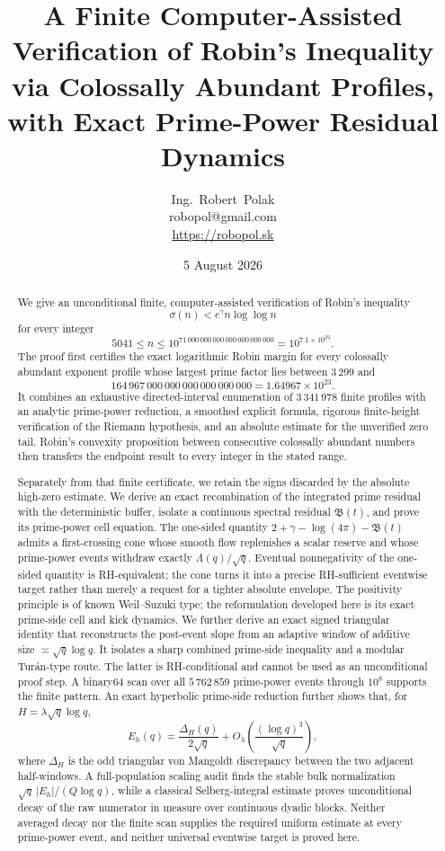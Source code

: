 \documentclass[11pt,a4paper]{article}
\title{\bfseries A Finite Computer-Assisted Verification of Robin's Inequality\\
\large via Colossally Abundant Profiles, with Exact Prime-Power Residual Dynamics}
\author{Ing.~Robert~Polak \\ \small robopol@gmail.com \\ \small \url{https://robopol.sk}}
\date{5 August 2026}
\numberwithin{equation}{section}
\theoremstyle{definition}
\newcommand{\Xmin}{3\,299}
\newcommand{\Xmax}{164\,967\,000\,000\,000\,000\,000\,000}
\newcommand{\Kcut}{71\,000\,000\,000\,000\,000\,000\,000}
\newcommand{\Bres}{\mathfrak B}
\begin{document}
\maketitle

\begin{abstract}
We give an unconditional finite, computer-assisted verification of Robin's
inequality
\[
  \sigma(n)<e^\gamma n\log\log n
\]
for every integer
\[
  5041\le n\le 10^{\Kcut}
  =10^{7.1\times10^{22}}.
\]
The proof first certifies the exact logarithmic Robin margin for every
colossally abundant exponent profile whose largest prime factor lies between
\(\Xmin\) and
\[
  \Xmax=1.64967\times10^{23}.
\]
It combines an exhaustive directed-interval enumeration of
\(3\,341\,978\) finite profiles with an analytic prime-power reduction, a
smoothed explicit formula, rigorous finite-height verification of the
Riemann hypothesis, and an absolute estimate for the unverified zero tail.
Robin's convexity proposition between consecutive colossally abundant
numbers then transfers the endpoint result to every integer in the stated
range.

Separately from that finite certificate, we retain the signs discarded by
the absolute high-zero estimate.  We derive an exact recombination of the
integrated prime residual with the deterministic buffer, isolate a continuous
spectral residual \(\Bres(t)\), and prove its prime-power cell equation.  The
one-sided quantity \(2+\gamma-\log(4\pi)-\Bres(t)\) admits a first-crossing
cone whose smooth flow replenishes a scalar reserve and whose prime-power
events withdraw exactly \(\Lambda(q)/\sqrt q\).  Eventual nonnegativity of the
one-sided quantity is RH-equivalent; the cone turns it into a precise
RH-sufficient eventwise target rather than merely a request for a tighter
absolute envelope.  The positivity principle is of known Weil--Suzuki type;
the reformulation developed here is its exact prime-side cell and kick
dynamics.  We further derive an exact signed triangular identity that
reconstructs the post-event slope from an adaptive window of additive size
\(\asymp\sqrt q\log q\).  It isolates a sharp combined prime-side inequality
and a modular Tur\'an-type route.  The latter is RH-conditional and cannot be
used as an unconditional proof step.  A binary64 scan over all
\(5\,762\,859\) prime-power events through \(10^8\) supports the finite
pattern.  An exact hyperbolic prime-side reduction further shows that, for
\(H=\lambda\sqrt q\log q\),
\[
 E_h(q)=\frac{\Delta_H(q)}{2\sqrt q}
 +O_\lambda\!\left(\frac{(\log q)^3}{\sqrt q}\right),
\]
where \(\Delta_H\) is the odd triangular von Mangoldt discrepancy between
the two adjacent half-windows.  A full-population scaling audit finds the
stable bulk normalization \(\sqrt q\,|E_h|/(Q\log q)\), while a classical
Selberg-integral estimate proves unconditional decay of the raw numerator in
measure over continuous dyadic blocks.  Neither averaged decay nor the
finite scan supplies the required uniform estimate at every prime-power
event, and neither universal eventwise target is proved here.


\end{abstract}
\end{document}
